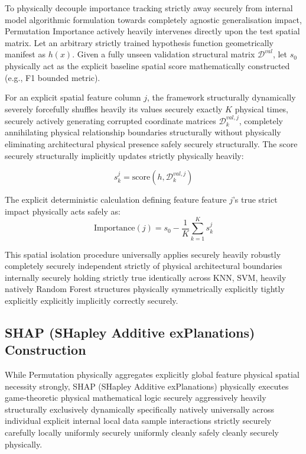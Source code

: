 \documentclass[conference]{IEEEtran}
\begin{document}
To physically decouple importance tracking strictly away securely from internal model algorithmic formulation towards completely agnostic generalisation impact, Permutation Importance actively heavily intervenes directly upon the test spatial matrix. Let an arbitrary strictly trained hypothesis function geometrically manifest as $h(x)$. Given a fully unseen validation structural matrix $\mathcal{D}^{val}$, let $s_0$ physically act as the explicit baseline spatial score mathematically constructed (e.g., F1 bounded metric).

For an explicit spatial feature column $j$, the framework structurally dynamically severely forcefully shuffles heavily its values securely exactly $K$ physical times, securely actively generating corrupted coordinate matrices $\mathcal{D}_k^{val, j}$, completely annihilating physical relationship boundaries structurally without physically eliminating architectural physical presence safely securely structurally. The score securely structurally implicitly updates strictly physically heavily:

\begin{equation}
s_k^j = \text{score}(h, \mathcal{D}_k^{val, j})
\end{equation}

The explicit deterministic calculation defining feature feature $j$'s true strict impact physically acts safely as:
\begin{equation}
\text{Importance}(j) = s_0 - \frac{1}{K} \sum_{k=1}^K s_k^j
\end{equation}

This spatial isolation procedure universally applies securely heavily robustly completely securely independent strictly of physical architectural boundaries internally securely holding strictly true identically across KNN, SVM, heavily natively Random Forest structures physically symmetrically explicitly tightly explicitly explicitly implicitly correctly securely.

\subsection{SHAP (SHapley Additive exPlanations) Construction}

While Permutation physically aggregates explicitly global feature physical spatial necessity strongly, SHAP (SHapley Additive exPlanations) physically executes game-theoretic physical mathematical logic securely aggressively heavily structurally exclusively dynamically specifically natively universally across individual explicit internal local data sample interactions strictly securely carefully locally uniformly securely uniformly cleanly safely cleanly securely physically.
\end{document}
